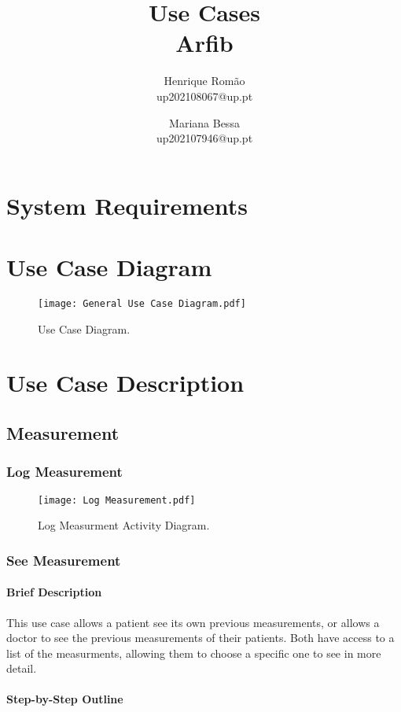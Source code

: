 \documentclass{report}
\title{\Huge \textbf{Use Cases}\\ \Large Arfib}
\author{
    Henrique Romão \\ up202108067@up.pt
    \and
    Mariana Bessa \\ up202107946@up.pt
}
\begin{document}
\maketitle

\tableofcontents

\chapter{System Requirements}

\newpage
\chapter{Use Case Diagram}

\begin{figure}[ht]
    \centering
    \texttt{[image: General Use Case Diagram.pdf]}
    \caption{Use Case Diagram.}
    \label{fig:Use Case}
\end{figure}

\chapter{Use Case Description}
\section{Measurement}
\subsection{Log Measurement}
\begin{figure}[ht]
    \centering
    \texttt{[image: Log Measurement.pdf]}
    \caption{Log Measurment Activity Diagram.}
    \label{fig:Log Measure}
\end{figure}


\subsection{See Measurement}
\subsubsection{Brief Description}
This use case allows a patient see its own previous measurements, or allows a doctor to see the previous measurements of their patients.
Both have access to a list of the measurments, allowing them to choose a specific one to see in more detail.

\subsubsection{Step-by-Step Outline}
\end{document}
